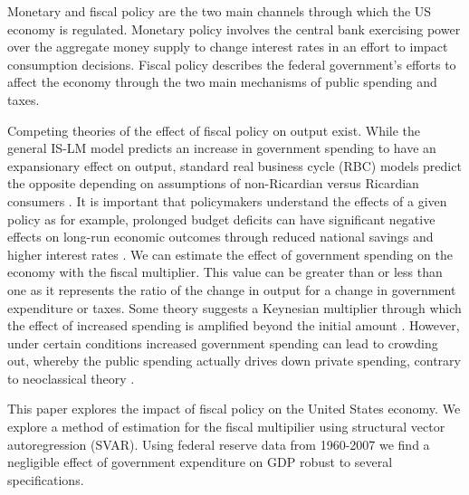 
Monetary and fiscal policy are the two main channels through which the US economy is regulated.  Monetary policy involves the central bank exercising power over the aggregate money supply to change interest rates in an effort to impact consumption decisions.  Fiscal policy describes the federal government's efforts to affect the economy through the two main mechanisms of public spending and taxes.  



Competing theories of the effect of fiscal policy on output exist.  While the general IS-LM model predicts an increase in government spending to have an expansionary effect on output, standard real business cycle (RBC) models predict the opposite depending on assumptions of non-Ricardian versus Ricardian consumers \parencite{gali2007understanding}.  It is important that policymakers understand the effects of a given policy as for example, prolonged budget deficits can have significant negative effects on long-run economic outcomes through reduced national savings and higher interest rates \parencite{gale2003economic}. %
We can estimate the effect of government spending on the economy with the fiscal multiplier.  
This value can be greater than or less than one as it represents the ratio of the change in output for a change in government expenditure or taxes.  Some theory suggests a Keynesian multiplier through which the effect of increased spending is amplified beyond the initial amount \parencite{barro2011macroeconomic}.  However, under certain conditions increased government spending can lead to crowding out, whereby the public spending actually drives down private spending, contrary to neoclassical theory \parencite{berge2021fiscal}.




This paper explores the impact of fiscal policy on the United States economy.  We explore a method of estimation for the fiscal multipilier using structural vector autoregression (SVAR).  Using federal reserve data from 1960-2007 we find a negligible effect of government expenditure on GDP robust to several specifications.